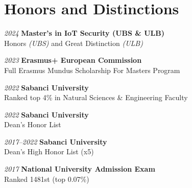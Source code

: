 \section{Honors and Distinctions}
\begin{onecolentry}
    \textit{2024} \textbf{Master's in IoT Security (UBS \& ULB)}\\
    Honors \textit{(UBS)} and Great Distinction \textit{(ULB)}
\end{onecolentry}
\vspace{\betweenentryspace}

\begin{onecolentry}
    \textit{2023} \textbf{Erasmus+ European Commission}\\
    Full Erasmus Mundus Scholarship For Masters Program
\end{onecolentry}
\vspace{\betweenentryspace}

\begin{onecolentry}
    \textit{2022} \textbf{Sabanci University}\\
    Ranked top 4\% in Natural Sciences \& Engineering Faculty
\end{onecolentry}
\vspace{\betweenentryspace}

\begin{onecolentry}
    \textit{2022} \textbf{Sabanci University}\\
    Dean's Honor List
\end{onecolentry}
\vspace{\betweenentryspace}

\begin{onecolentry}
    \textit{2017–2022} \textbf{Sabanci University}\\
    Dean's High Honor List (x5)
\end{onecolentry}
\vspace{\betweenentryspace}

\begin{onecolentry}
    \textit{2017} \textbf{National University Admission Exam}\\
    Ranked 1481st (top 0.07\%)
\end{onecolentry}





